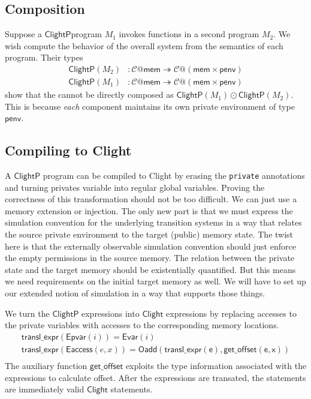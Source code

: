 \documentclass[acmsmall,screen,review,anonymous]{acmart}
\newcommand{\kw}[1]{\ensuremath{ \mathsf{#1} }}
\newcommand{\ClightP}{\ensuremath{ \mathsf{ClightP} }}
\newcommand{\Clight}{\ensuremath{ \mathsf{Clight} }}
\begin{document}
\subsection{Composition}

Suppose a \ClightP program $M_1$
invokes functions in a second program $M_2$.
We wish compute the behavior of the overall system
from the semantics of each program.
Their types
\begin{align*}
    \ClightP(M_2) &:
    \mathcal{C}@\kw{mem} \twoheadrightarrow
    \mathcal{C}@(\kw{mem} \times \kw{penv})
  \\
    \ClightP(M_1) &:
    \mathcal{C}@\kw{mem} \twoheadrightarrow
    \mathcal{C}@(\kw{mem} \times \kw{penv})
\end{align*}
show that the cannot be directly composed
as $\ClightP(M_1) \odot \ClightP(M_2)$.
This is because \emph{each} component
maintains its own private environment of type $\kw{penv}$.


\subsection{Compiling to Clight}

A \ClightP{} program can be compiled to Clight
by erasing the \texttt{private} annotations
and turning privates variable into regular
global variables.
{
\color{gray}
Proving the correctness of this transformation
should not be too difficult.
We can just use a memory extension or injection.
The only new part is that we must express
the simulation convention for the underlying transition systems
in a way that relates the source private environment
to the target (public) memory state.
The twist here is that
the externally observable simulation convention
should just enforce the empty permissions in the source memory.
The relation between the private state and the target memory
should be existentially quantified.
But this means we need requirements on the initial target memory as well.
We will have to set up our extended notion of simulation
in a way that supports those things.
}

We turn the $\ClightP$ expressions into $\Clight$ expressions
by replacing accesses to the private variables
with accesses to the corresponding memory locations.
\begin{gather*}
  \kw{transl\_expr}(\kw{Epvar}(i)) = \kw{Evar}(i)\\
  \kw{transl\_expr}(\kw{Eaccess}(e, x)) = \kw{Oadd}(\kw{transl\_expr(e)}, \kw{get\_offset(e, x)})\\
\end{gather*}
The auxiliary function $\kw{get\_offset}$
exploits the type information associated with the expressions
to calculate offset.
After the expressions are transated, the statements
are immediately valid $\Clight$ statements.
\end{document}
